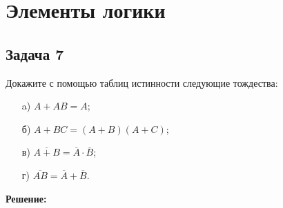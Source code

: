 \documentclass[a4paper,12pt]{article}
\begin{document}
\vspace{1cm}


\section{Элементы логики}

\subsection{Задача 7}
Докажите с помощью таблиц истинности следующие тождества:

\begin{itemize}
    \item[a)] \(A + AB = A\);
    \item[б)] \(A + BC = (A + B)(A + C)\);
    \item[в)] \(\overline{A + B} = \overline{A} \cdot \overline{B}\);
    \item[г)] \(\overline{AB} = \overline{A} + \overline{B}\).
\end{itemize}

\textbf{Решение:}
\end{document}
